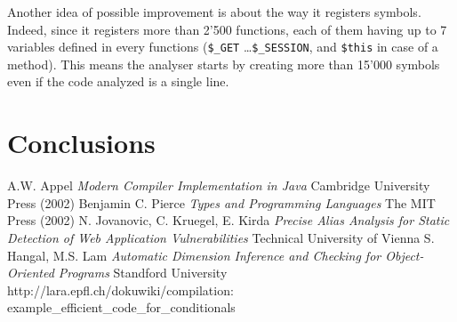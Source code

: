 \documentclass[a4paper]{article}
\begin{document}
Another idea of possible improvement is about the way it registers symbols.
Indeed, since it registers more than 2'500 functions, each of them having up to
7 variables defined in every functions (\verb/$_GET/ \ldots \verb/$_SESSION/,
and \verb/$this/ in case of a method). This means the analyser starts by
creating more than 15'000 symbols even if the code analyzed is a single line.

\section{Conclusions}


\begin{thebibliography}{99}
  A.W. Appel {\it Modern Compiler Implementation in Java}
    Cambridge University Press (2002)
  Benjamin C. Pierce {\it Types and Programming Languages} The
    MIT Press (2002)
  N. Jovanovic, C. Kruegel, E. Kirda {\it Precise Alias
    Analysis for Static Detection of Web Application Vulnerabilities} Technical
    University of Vienna
  S. Hangal, M.S. Lam {\it Automatic Dimension Inference and
    Checking for Object-Oriented Programs} Standford University
  \mbox{http://lara.epfl.ch/dokuwiki/compilation:}
    \mbox{example\_efficient\_code\_for\_conditionals}
\end{thebibliography}
\end{document}
